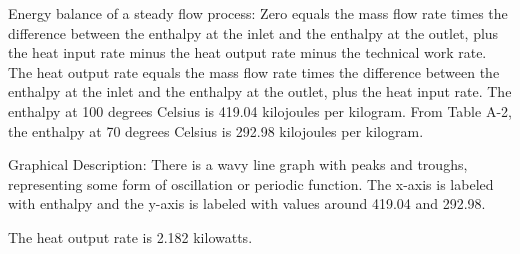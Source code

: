 Energy balance of a steady flow process:
Zero equals the mass flow rate times the difference between the enthalpy at the inlet and the enthalpy at the outlet, plus the heat input rate minus the heat output rate minus the technical work rate.
The heat output rate equals the mass flow rate times the difference between the enthalpy at the inlet and the enthalpy at the outlet, plus the heat input rate.
The enthalpy at 100 degrees Celsius is 419.04 kilojoules per kilogram.
From Table A-2, the enthalpy at 70 degrees Celsius is 292.98 kilojoules per kilogram.

Graphical Description:
There is a wavy line graph with peaks and troughs, representing some form of oscillation or periodic function. The x-axis is labeled with enthalpy and the y-axis is labeled with values around 419.04 and 292.98.

The heat output rate is 2.182 kilowatts.